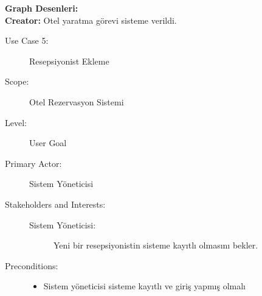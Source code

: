 \documentclass[12pt,a4paper]{report}
\begin{document}
\newpage
{\bf Graph Desenleri:}\\
{\bf Creator:} Otel yaratma görevi sisteme verildi.\\

\newpage
\begin{description}
\item[Use Case 5:] Resepsiyonist Ekleme\\
\item[Scope:] Otel Rezervasyon Sistemi
\item[Level:] User Goal
\item[Primary Actor:] Sistem Yöneticisi 
\item[Stakeholders and Interests:] \hspace{10 mm}
\begin{description} 
\item[Sistem Yöneticisi:] Yeni bir resepsiyonistin sisteme kayıtlı olmasını bekler.
\end{description}
\item[Preconditions:] \hspace{10mm}
\begin{itemize}
\item Sistem yöneticisi sisteme kayıtlı ve giriş yapmış olmalı
\end{itemize}


\end{description}
\end{document}
